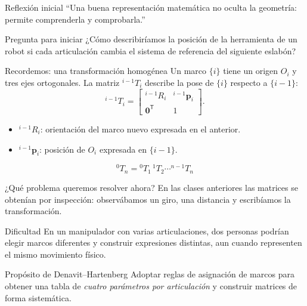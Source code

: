 \documentclass[aspectratio=169,11pt]{beamer}
\begin{document}
\TitleSlide
\NormasSlide

\begin{frame}{Reflexión inicial}
 \centering\vspace{0.65cm}
 {\Large ``Una buena representación matemática no oculta
 la geometría: permite comprenderla y comprobarla.''}
 \vspace{0.55cm}
 \begin{block}{Pregunta para iniciar}
 ¿Cómo describiríamos la posición de la herramienta de un robot
 si cada articulación cambia el sistema de referencia del siguiente eslabón?
 \end{block}
\end{frame}

\begin{frame}[t]{Recordemos: una transformación homogénea}
 \small
 Un marco $\{i\}$ tiene un origen $O_i$ y tres ejes ortogonales.
 La matriz ${}^{i-1}T_i$ describe la pose de $\{i\}$ respecto a $\{i-1\}$:
 \[
 {}^{i-1}T_i=\begin{bmatrix}
 {}^{i-1}R_i&{}^{i-1}\mathbf p_i\\
 \mathbf0^{\mathsf T}&1
 \end{bmatrix}.
 \]
 \pause
 \begin{itemize}
  \item ${}^{i-1}R_i$: orientación del marco nuevo expresada en el anterior.
  \item ${}^{i-1}\mathbf p_i$: posición de $O_i$ expresada en $\{i-1\}$.
 \end{itemize}
 \[
 \boxed{{}^{0}T_n={}^{0}T_1\,{}^{1}T_2\cdots{}^{n-1}T_n}
 \]
\end{frame}

\begin{frame}[t]{¿Qué problema queremos resolver ahora?}
 \small
 En las clases anteriores las matrices se obtenían por inspección:
 observábamos un giro, una distancia y escribíamos la transformación.
 \pause
 \begin{alertblock}{Dificultad}
 En un manipulador con varias articulaciones, dos personas podrían
 elegir marcos diferentes y construir expresiones distintas,
 aun cuando representen el mismo movimiento físico.
 \end{alertblock}
 \pause
 \begin{block}{Propósito de Denavit--Hartenberg}
 Adoptar reglas de asignación de marcos para obtener una tabla
 de \emph{cuatro parámetros por articulación} y construir matrices
 de forma sistemática.
 \end{block}
\end{frame}
\end{document}
